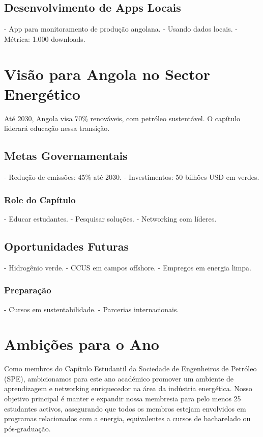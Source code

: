\documentclass[12pt]{article}
\begin{document}
\subsection{Desenvolvimento de Apps Locais}
- App para monitoramento de produção angolana.
- Usando dados locais.
- Métrica: 1.000 downloads.

\section{Visão para Angola no Sector Energético}

Até 2030, Angola visa 70\% renováveis, com petróleo sustentável. O capítulo liderará educação nessa transição.

\subsection{Metas Governamentais}
- Redução de emissões: 45\% até 2030.
- Investimentos: 50 bilhões USD em verdes.

\subsubsection{Role do Capítulo}
- Educar estudantes.
- Pesquisar soluções.
- Networking com líderes.

\subsection{Oportunidades Futuras}
- Hidrogênio verde.
- CCUS em campos offshore.
- Empregos em energia limpa.

\subsubsection{Preparação}
- Cursos em sustentabilidade.
- Parcerias internacionais.

\section{Ambições para o Ano}

Como membros do Capítulo Estudantil da Sociedade de Engenheiros de Petróleo (SPE), ambicionamos para este ano académico promover um ambiente de aprendizagem e networking enriquecedor na área da indústria energética. Nosso objetivo principal é manter e expandir nossa membresia para pelo menos 25 estudantes activos, assegurando que todos os membros estejam envolvidos em programas relacionados com a energia, equivalentes a cursos de bacharelado ou pós-graduação.
\end{document}
